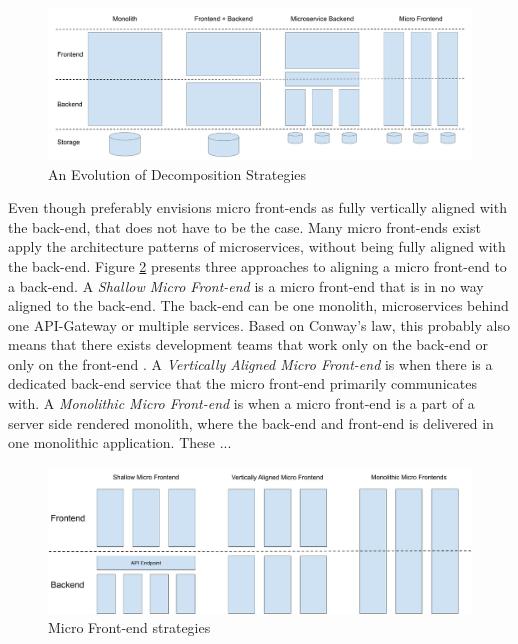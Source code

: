 \begin{figure}
    \centering
    \includegraphics[width=\linewidth]{images/evolution-of-decomposition-strategies.pdf}
    \caption{An Evolution of Decomposition Strategies}
    \label{fig:evolution-of-decomposition-strategies}
\end{figure}

Even though \citeauthor{Geers2020} preferably envisions micro front-ends as fully vertically aligned with the back-end, that does not have to be the case. Many micro front-ends exist apply the architecture patterns of microservices, without being fully aligned with the back-end. Figure \ref{fig:micro-frontend-alignment} presents three approaches to aligning a micro front-end to a back-end. A \textit{Shallow Micro Front-end} is a micro front-end that is in no way aligned to the back-end. The back-end can be one monolith, microservices behind one API-Gateway or multiple services. Based on Conway's law, this probably also means that there exists development teams that work only on the back-end or only on the front-end \cites{Conway}. A \textit{Vertically Aligned Micro Front-end} is when there is a dedicated back-end service that the micro front-end primarily communicates with. A \textit{Monolithic Micro Front-end} is when a micro front-end is a part of a server side rendered monolith, where the back-end and front-end is delivered in one monolithic application. These ...

\begin{figure}
    \centering
    \includegraphics[width=\linewidth]{images/micro-frontend-strategies.pdf}
    \caption{Micro Front-end strategies}
    \label{fig:micro-frontend-alignment}
\end{figure}


